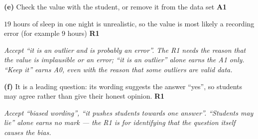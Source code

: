 \documentclass[12pt, twoside]{article}
\begin{document}
\begin{enumerate}[itemsep=0.3cm]
\textbf{(e)} Check the value with the student, or remove it from the data
set \hfill \textbf{A1}

$19$ hours of sleep in one night is unrealistic, so the value is most likely
a recording error (for example $9$ hours) \hfill \textbf{R1}

\emph{Accept ``it is an outlier and is probably an error''. The R1 needs the
reason that the value is implausible or an error; ``it is an outlier'' alone
earns the A1 only. ``Keep it'' earns A0, even with the reason that some
outliers are valid data.}

\textbf{(f)} It is a leading question: its wording suggests the answer
``yes'', so students may agree rather than give their honest opinion.
\hfill \textbf{R1}

\emph{Accept ``biased wording'', ``it pushes students towards one answer''.
``Students may lie'' alone earns no mark --- the R1 is for identifying that
the question itself causes the bias.}

\end{enumerate}
\end{document}
